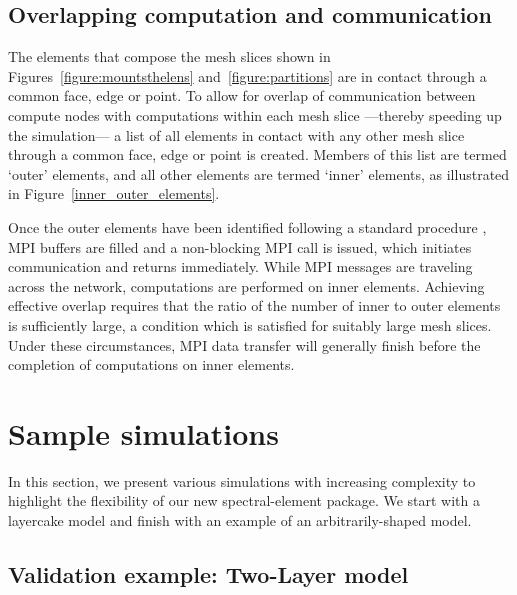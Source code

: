 \documentclass[referee,extra]{gji}
\begin{document}
\subsection{Overlapping computation and communication}

The elements that compose the mesh slices shown in Figures~\ref{figure:mountsthelens} and~\ref{figure:partitions} are in contact
through a common face, edge or point.
To allow for overlap of communication between compute nodes with computations within each mesh slice
---thereby speeding up the simulation---
a list of all elements in contact with any other mesh
slice through a common face, edge or point is created.
Members of this list are termed `outer' elements,
and all other elements are termed `inner' elements,
as illustrated in Figure~\ref{inner_outer_elements}.

Once the outer elements have been identified following a standard procedure
\citep[see e.g.,][]{DaNa98,MaKoBlLe08,Mic09,MiKo10,KoErGoMi10,Kom11},
MPI buffers are filled and a non-blocking MPI call is issued, which initiates communication and returns immediately.
While MPI messages are traveling across the network, computations are performed on inner elements.
Achieving effective overlap requires that the ratio of the number of inner to outer elements is sufficiently
large, a condition which is satisfied for suitably large mesh slices.
Under these circumstances, MPI data transfer will generally finish before the completion of  computations on inner elements.

\section{Sample simulations}\label{sec:example}

In this section, we present various simulations with increasing complexity to highlight the flexibility of
our new spectral-element package.
We start with a layercake model and finish with an example
of an arbitrarily-shaped model.

\subsection{Validation example: Two-Layer model}\label{subsec:examplevalidation}
\end{document}

